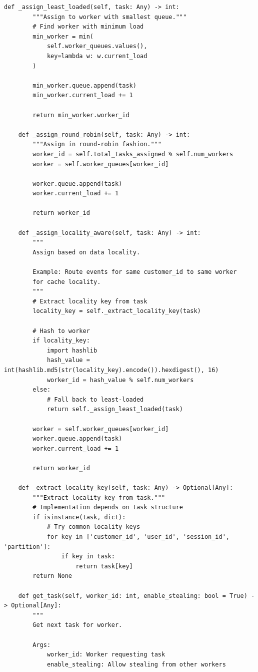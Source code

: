 \begin{lstlisting}[style=python, caption={Load Balancer with Work Stealing}]
    def _assign_least_loaded(self, task: Any) -> int:
        """Assign to worker with smallest queue."""
        # Find worker with minimum load
        min_worker = min(
            self.worker_queues.values(),
            key=lambda w: w.current_load
        )

        min_worker.queue.append(task)
        min_worker.current_load += 1

        return min_worker.worker_id

    def _assign_round_robin(self, task: Any) -> int:
        """Assign in round-robin fashion."""
        worker_id = self.total_tasks_assigned % self.num_workers
        worker = self.worker_queues[worker_id]

        worker.queue.append(task)
        worker.current_load += 1

        return worker_id

    def _assign_locality_aware(self, task: Any) -> int:
        """
        Assign based on data locality.

        Example: Route events for same customer_id to same worker
        for cache locality.
        """
        # Extract locality key from task
        locality_key = self._extract_locality_key(task)

        # Hash to worker
        if locality_key:
            import hashlib
            hash_value = int(hashlib.md5(str(locality_key).encode()).hexdigest(), 16)
            worker_id = hash_value % self.num_workers
        else:
            # Fall back to least-loaded
            return self._assign_least_loaded(task)

        worker = self.worker_queues[worker_id]
        worker.queue.append(task)
        worker.current_load += 1

        return worker_id

    def _extract_locality_key(self, task: Any) -> Optional[Any]:
        """Extract locality key from task."""
        # Implementation depends on task structure
        if isinstance(task, dict):
            # Try common locality keys
            for key in ['customer_id', 'user_id', 'session_id', 'partition']:
                if key in task:
                    return task[key]
        return None

    def get_task(self, worker_id: int, enable_stealing: bool = True) -> Optional[Any]:
        """
        Get next task for worker.

        Args:
            worker_id: Worker requesting task
            enable_stealing: Allow stealing from other workers


\end{lstlisting}
